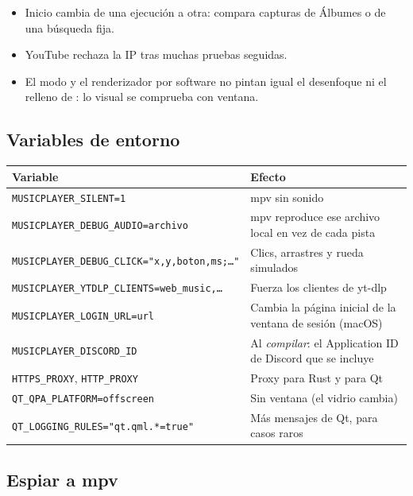 \begin{trampa}
\begin{itemize}
  \item Inicio cambia de una ejecución a otra: compara capturas de Álbumes o de una búsqueda
  fija.
  \item YouTube rechaza la IP tras muchas pruebas seguidas.
  \item El modo  y el renderizador por software no pintan igual el desenfoque
  ni el relleno de : lo visual se comprueba con ventana.
\end{itemize}
\end{trampa}

\subsection{Variables de entorno}

\begin{center}
\small
\begin{tabularx}{\linewidth}{@{}lX@{}}
\toprule
Variable & Efecto \\
\midrule
\texttt{MUSICPLAYER\_SILENT=1} & mpv sin sonido \\
\texttt{MUSICPLAYER\_DEBUG\_AUDIO=archivo} & mpv reproduce ese archivo local en vez de cada pista \\
\texttt{MUSICPLAYER\_DEBUG\_CLICK="x,y,boton,ms;\dots"} & Clics, arrastres y rueda simulados \\
\texttt{MUSICPLAYER\_YTDLP\_CLIENTS=web\_music,\dots} & Fuerza los clientes de yt-dlp \\
\texttt{MUSICPLAYER\_LOGIN\_URL=url} & Cambia la página inicial de la ventana de sesión (macOS) \\
\texttt{MUSICPLAYER\_DISCORD\_ID} & Al \emph{compilar}: el Application ID de Discord que se incluye \\
\texttt{HTTPS\_PROXY}, \texttt{HTTP\_PROXY} & Proxy para Rust y para Qt \\
\texttt{QT\_QPA\_PLATFORM=offscreen} & Sin ventana (el vidrio cambia) \\
\texttt{QT\_LOGGING\_RULES="qt.qml.*=true"} & Más mensajes de Qt, para casos raros \\
\bottomrule
\end{tabularx}
\end{center}

\subsection{Espiar a mpv}

